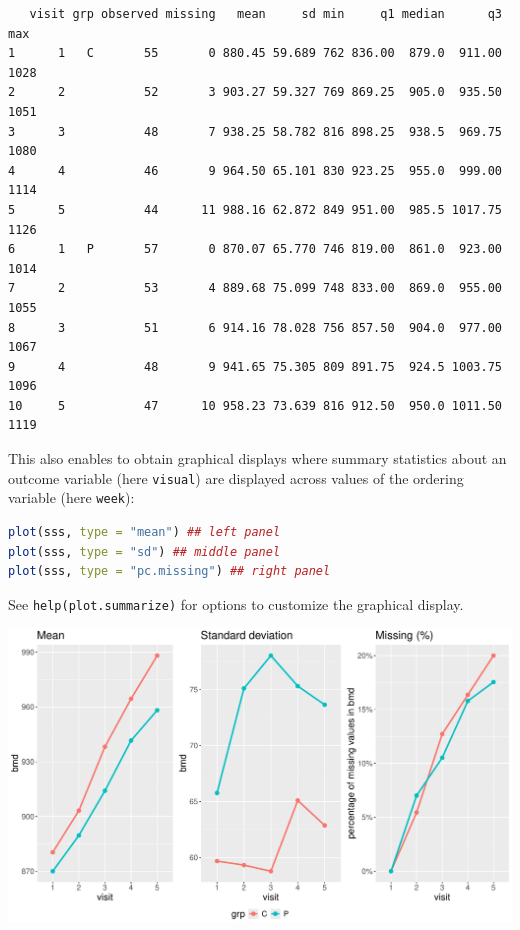 \documentclass[12pt]{article}
\begin{document}
\label{}
\begin{verbatim}
   visit grp observed missing   mean     sd min     q1 median      q3  max
1      1   C       55       0 880.45 59.689 762 836.00  879.0  911.00 1028
2      2           52       3 903.27 59.327 769 869.25  905.0  935.50 1051
3      3           48       7 938.25 58.782 816 898.25  938.5  969.75 1080
4      4           46       9 964.50 65.101 830 923.25  955.0  999.00 1114
5      5           44      11 988.16 62.872 849 951.00  985.5 1017.75 1126
6      1   P       57       0 870.07 65.770 746 819.00  861.0  923.00 1014
7      2           53       4 889.68 75.099 748 833.00  869.0  955.00 1055
8      3           51       6 914.16 78.028 756 857.50  904.0  977.00 1067
9      4           48       9 941.65 75.305 809 891.75  924.5 1003.75 1096
10     5           47      10 958.23 73.639 816 912.50  950.0 1011.50 1119
\end{verbatim}

This also enables to obtain graphical displays where summary
statistics about an outcome variable (here \texttt{visual}) are displayed
across values of the ordering variable (here \texttt{week}):
\begin{lstlisting}[language=r,numbers=none]
plot(sss, type = "mean") ## left panel
plot(sss, type = "sd") ## middle panel
plot(sss, type = "pc.missing") ## right panel
\end{lstlisting}

See \texttt{help(plot.summarize)} for options to customize the graphical
display.

\begin{center}
\includegraphics[trim={0 0 0 0},width=1\textwidth]{./figures/summarize.pdf}
\end{center}

\clearpage 
\end{document}

